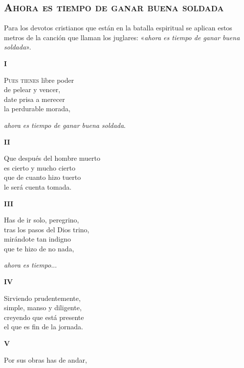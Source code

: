 \documentclass[11pt,twoside]{article}
\begin{document}
\subsection*{\centering\textsc{Ahora es tiempo de ganar buena soldada}}
%
Para los devotos cristianos que están en la batalla espiritual se aplican estos metros de la canción que llaman los juglares: «\emph{ahora es tiempo de ganar buena soldada}».\par
%
\bnum
\begin{center}
\textbf{I}
\end{center}
\postart
\textsc{Pues tienes} libre poder\\
de pelear y vencer,\\
date prisa a merecer\\
la perdurable morada,\par
\emph{ahora es tiempo de ganar buena soldada}.\par
\poend
%
\begin{center}
\textbf{II}
\end{center}
\postart
Que después del hombre muerto\\
es cierto y mucho cierto\\
que de cuanto hizo tuerto\\
le será cuenta tomada.\par
\poend
%
\begin{center}
\textbf{III}
\end{center}
\postart
Has de ir solo, peregrino,\\
tras los pasos del Dios trino,\\
mirándote tan indigno\\
que te hizo de no nada,\par
\emph{ahora es tiempo}...\par
\poend
%
\begin{center}
\textbf{IV}
\end{center}
\postart
Sirviendo prudentemente,\\
simple, manso y diligente,\\
creyendo que está presente\\
el que es fin de la jornada.\par
\poend
%
\begin{center}
\textbf{V}
\end{center}
\postart
Por sus obras has de andar,\\
\end{document}

